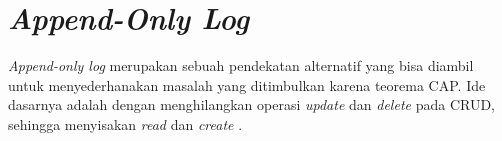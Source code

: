 \section{\textit{Append-Only Log}}

\textit{Append-only log} merupakan sebuah pendekatan alternatif yang bisa diambil untuk menyederhanakan masalah yang ditimbulkan karena teorema CAP. Ide dasarnya adalah dengan menghilangkan operasi \textit{update} dan \textit{delete} pada CRUD, sehingga menyisakan \textit{read} dan \textit{create} \parencite{howToBeatCAP}.





